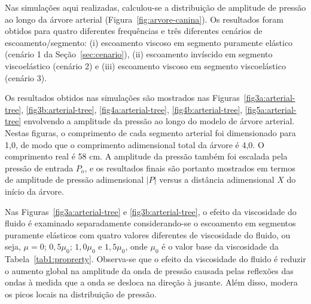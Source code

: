 \documentclass[
        english,			
        brazil			        %
        ,<...>]{abntbibufjf}
\begin{document}
Nas simulações aqui realizadas, calculou-se a distribuição de amplitude de pressão ao longo da árvore arterial (Figura~\ref{fig:arvore-canina}). Os resultados foram obtidos para quatro diferentes frequên\-cias e três diferentes cenários de escoamento/segmento: (i) escoamento viscoso em segmento puramente elástico (cenário 1 da Seção~\ref{sec:cenario}), (ii) escoamento invíscido em segmento viscoelástico (cenário 2) e (iii) escoamento viscoso em segmento viscoelástico (cenário 3). 

Os resultados obtidos nas simulações são mostrados nas Figuras~\ref{fig3a:arterial-tree}, \ref{fig3b:arterial-tree}, \ref{fig4a:arterial-tree}, \ref{fig4b:arterial-tree}, \ref{fig5a:arterial-tree} envolvendo a amplitude da pressão ao longo do modelo de árvore arterial. Nestas figuras, o comprimento de cada segmento arterial foi dimensionado para 1,0, de modo que o comprimento adimensional total da árvore é 4,0. O comprimento real é 58 cm. A amplitude da pressão também foi escalada pela pressão de entrada $P_o$, e os resultados finais são portanto mostrados em termos de amplitude de pressão adimensional $|P|$ versus a distância adimensional $X$ do início da árvore.

Nas Figuras~\ref{fig3a:arterial-tree} e \ref{fig3b:arterial-tree}, o efeito da viscosidade do fluido é examinado separadamente conside\-ran\-do-se o escoamento em segmentos puramente elásticos com quatro valores diferentes de viscosidade do fluido, ou seja, $\mu = 0$; $0,5 \mu_0$; $1,0 \mu_0$ e $1,5 \mu_0$, onde $\mu_0$ é o valor base da viscosidade da Tabela~\ref{tab1:proprerty}. Observa-se que o efeito da viscosidade do fluido é reduzir o aumento global na amplitude da onda de pressão causada pelas reflexões das ondas à medida que a onda se desloca na direção à jusante. Além disso, modera os picos locais na distribuição de pressão.
\end{document}
